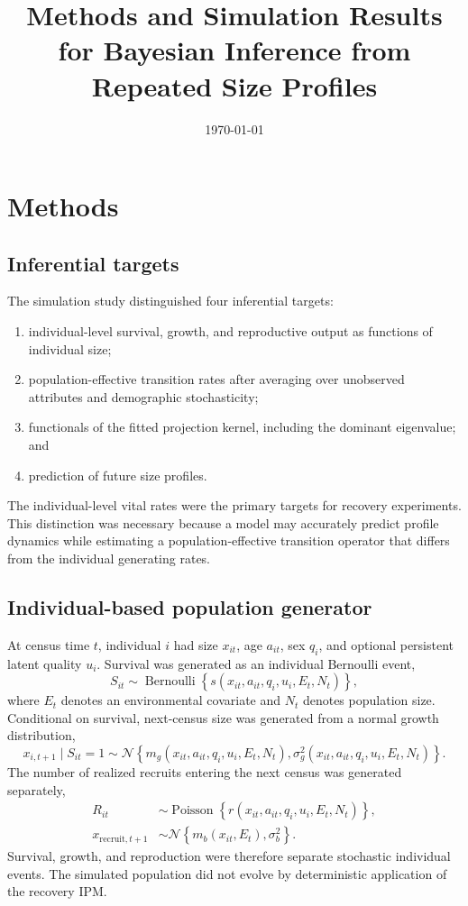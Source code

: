 \documentclass[11pt]{article}
\title{Methods and Simulation Results for Bayesian Inference from Repeated Size Profiles}
\author{}
\date{\today}
\newcommand{\Normal}{\mathcal{N}}
\begin{document}
\maketitle

\section{Methods}

\subsection{Inferential targets}

The simulation study distinguished four inferential targets:
\begin{enumerate}
  \item individual-level survival, growth, and reproductive output as
  functions of individual size;
  \item population-effective transition rates after averaging over unobserved
  attributes and demographic stochasticity;
  \item functionals of the fitted projection kernel, including the dominant
  eigenvalue; and
  \item prediction of future size profiles.
\end{enumerate}
The individual-level vital rates were the primary targets for recovery
experiments. This distinction was necessary because a model may accurately
predict profile dynamics while estimating a population-effective transition
operator that differs from the individual generating rates.

\subsection{Individual-based population generator}

At census time \(t\), individual \(i\) had size \(x_{it}\), age \(a_{it}\),
sex \(q_i\), and optional persistent latent quality \(u_i\). Survival was
generated as an individual Bernoulli event,
\begin{equation}
  S_{it} \sim \operatorname{Bernoulli}
  \left\{s(x_{it},a_{it},q_i,u_i,E_t,N_t)\right\},
\end{equation}
where \(E_t\) denotes an environmental covariate and \(N_t\) denotes
population size. Conditional on survival, next-census size was generated from
a normal growth distribution,
\begin{equation}
  x_{i,t+1}\mid S_{it}=1
  \sim \Normal\left\{m_g(x_{it},a_{it},q_i,u_i,E_t,N_t),
  \sigma_g^2(x_{it},a_{it},q_i,u_i,E_t,N_t)\right\}.
\end{equation}
The number of realized recruits entering the next census was generated
separately,
\begin{align}
  R_{it} &\sim \operatorname{Poisson}
  \left\{r(x_{it},a_{it},q_i,u_i,E_t,N_t)\right\},\\
  x_{\mathrm{recruit},t+1} &\sim
  \Normal\left\{m_b(x_{it},E_t),\sigma_b^2\right\}.
\end{align}
Survival, growth, and reproduction were therefore separate stochastic
individual events. The simulated population did not evolve by deterministic
application of the recovery IPM.
\end{document}
